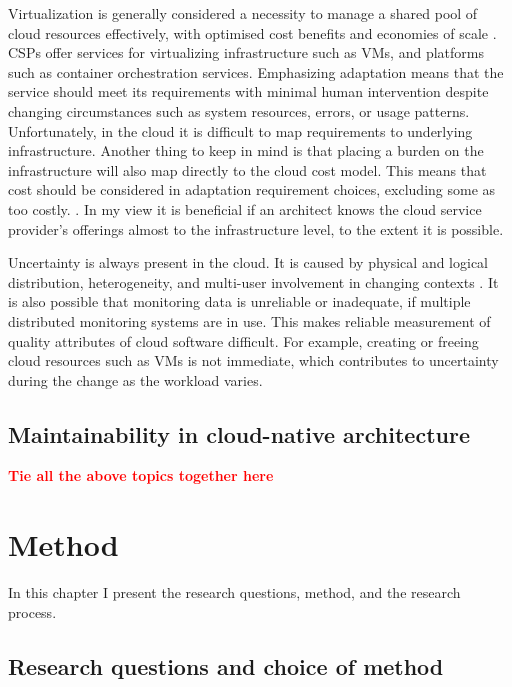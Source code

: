 \documentclass[utf8,english]{gradu3}
\newcommand{\todo}[1]{\textbf{\textcolor{red}{#1}}}
\begin{document}
Virtualization is generally considered a necessity to manage a shared pool of
cloud resources effectively, with optimised cost benefits and economies of scale
\parencite[8]{Pahl2018}. CSPs offer services for virtualizing
infrastructure such as VMs, and platforms such as container orchestration services.
Emphasizing adaptation means that the service should meet its requirements with
minimal human intervention despite changing circumstances such as system
resources, errors, or usage patterns. Unfortunately, in the cloud it is
difficult to map requirements to underlying infrastructure. Another thing to
keep in mind is that placing a burden on the infrastructure will also map
directly to the cloud cost model. This means that cost should be considered in
adaptation requirement choices, excluding some as too costly.
\parencite[3-10]{Pahl2018}. In my view it is beneficial if an architect knows
the cloud service provider's offerings almost to the infrastructure level, to
the extent it is possible.

Uncertainty is always present in the cloud. It is caused by physical and logical
distribution, heterogeneity, and multi-user involvement in changing contexts
\parencite[3]{Pahl2018}. It is also possible that monitoring data is unreliable
or inadequate, if multiple distributed monitoring systems are in use. This makes
reliable measurement of quality attributes of cloud software difficult. For
example, creating or freeing cloud resources such as VMs is not
immediate, which contributes to uncertainty during the change as the workload
varies. \parencite[3-11]{Pahl2018}


\section{Maintainability in cloud-native architecture}
\todo{Tie all the above topics together here}

\chapter{Method}
\label{chapter:method}

In this chapter I present the research questions, method, and the research process.

\section{Research questions and choice of method}
\end{document}
